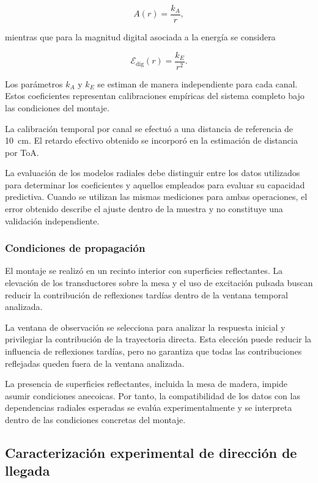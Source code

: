 \begin{equation}
    A(r)=\frac{k_A}{r},
\end{equation}

mientras que para la magnitud digital asociada a la
energía se considera

\begin{equation}
    \mathcal{E}_{\mathrm{dig}}(r)=\frac{k_E}{r^2}.
\end{equation}

Los parámetros $k_A$ y $k_E$ se estiman de manera
independiente para cada canal. Estos coeficientes
representan calibraciones empíricas del sistema
completo bajo las condiciones del montaje.

La calibración temporal por canal se efectuó a una
distancia de referencia de \SI{10}{\centi\metre}.
El retardo efectivo obtenido se incorporó en la
estimación de distancia por ToA.

La evaluación de los modelos radiales debe distinguir
entre los datos utilizados para determinar los
coeficientes y aquellos empleados para evaluar su
capacidad predictiva. Cuando se utilizan las mismas
mediciones para ambas operaciones, el error obtenido
describe el ajuste dentro de la muestra y no constituye
una validación independiente.

\subsubsection{Condiciones de propagación}

El montaje se realizó en un recinto interior con
superficies reflectantes. La elevación de los
transductores sobre la mesa y el uso de excitación
pulsada buscan reducir la contribución de reflexiones
tardías dentro de la ventana temporal analizada.

La ventana de observación se selecciona para analizar
la respuesta inicial y privilegiar la contribución de
la trayectoria directa. Esta elección puede reducir
la influencia de reflexiones tardías, pero no garantiza
que todas las contribuciones reflejadas queden fuera
de la ventana analizada.

La presencia de superficies reflectantes, incluida la
mesa de madera, impide asumir condiciones anecoicas.
Por tanto, la compatibilidad de los datos con las
dependencias radiales esperadas se evalúa
experimentalmente y se interpreta dentro de las
condiciones concretas del montaje.

\subsection{Caracterización experimental de dirección de llegada}
\label{sec:exp02_angular}

